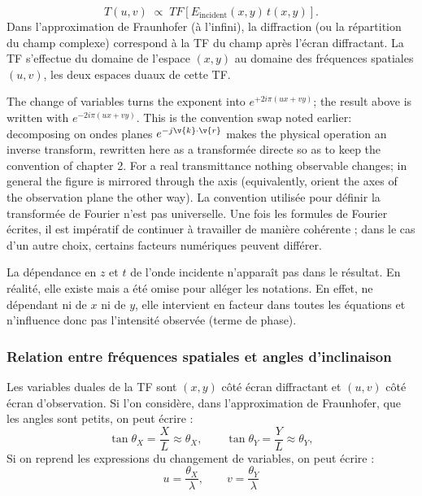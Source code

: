 \begin{theorem}
  \[
    T(u,v) \;\propto\; TF\!\left[E_{\text{incident}}(x,y)\, t(x,y)\right].
  \]
  Dans l'approximation de Fraunhofer (à l'infini), la diffraction (ou la
  répartition du champ complexe) correspond à la TF du champ après l'écran
  diffractant. La TF s'effectue du domaine de l'espace $(x,y)$ au domaine des
  fréquences spatiales $(u,v)$, les deux espaces duaux de cette TF.
\end{theorem}

\begin{remark}
  The change of variables turns the exponent into $e^{+2i\pi(ux+vy)}$; the
  result above is written with $e^{-2i\pi(ux+vy)}$. This is the convention swap
  noted earlier: decomposing on ondes planes $e^{-j\v{k}\cdot\v{r}}$ makes the
  physical operation an inverse transform, rewritten here as a transformée
  directe so as to keep the convention of chapter 2. For a real transmittance
  nothing observable changes; in general the figure is mirrored through the
  axis (equivalently, orient the axes of the observation plane the other way).
  La convention utilisée pour définir la transformée de Fourier n'est pas
  universelle. Une fois les formules de Fourier écrites, il est impératif de
  continuer à travailler de manière cohérente ; dans le cas d'un autre choix,
  certains facteurs numériques peuvent différer.
\end{remark}

\begin{remark}
  La dépendance en $z$ et $t$ de l'onde incidente n'apparaît pas dans le
  résultat. En réalité, elle existe mais a été omise pour alléger les notations.
  En effet, ne dépendant ni de $x$ ni de $y$, elle intervient en facteur dans
  toutes les équations et n'influence donc pas l'intensité observée (terme de
  phase).
\end{remark}

\subsubsection{Relation entre fréquences spatiales et angles d'inclinaison}
Les variables duales de la TF sont $(x,y)$ côté écran diffractant et $(u,v)$
côté écran d'observation. Si l'on considère, dans l'approximation de Fraunhofer,
que les angles sont petits, on peut écrire :
\begin{equation*}
  \tan\theta_X = \frac{X}{L} \approx \theta_X,
  \qquad
  \tan\theta_Y = \frac{Y}{L} \approx \theta_Y,
\end{equation*}
Si on reprend les expressions du changement de variables, on peut écrire :
\begin{equation*}
  \boxed{\; u = \frac{\theta_X}{\lambda}, \qquad v = \frac{\theta_Y}{\lambda} \;}
\end{equation*}


